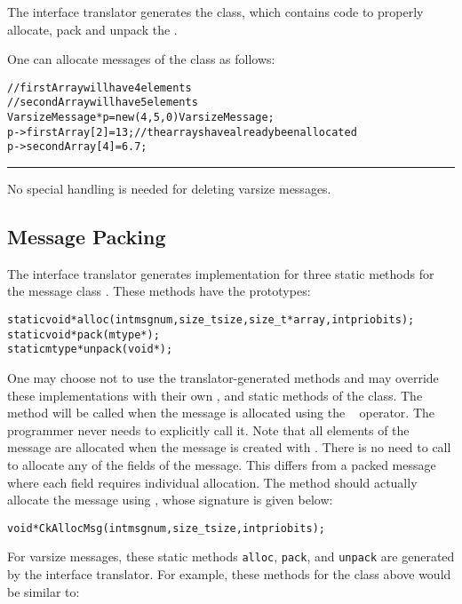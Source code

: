 {The interface translator generates the  class,
which contains code to properly allocate, pack and unpack the
.


One can allocate messages of the  class as follows:

\begin{alltt}
// firstArray will have 4 elements
// secondArray will have 5 elements 
VarsizeMessage* p = new(4, 5, 0) VarsizeMessage;
p->firstArray[2] = 13;     // the arrays have already been allocated 
p->secondArray[4] = 6.7; 
\end{alltt}

\hrule
\normalsize
No special handling is needed for deleting varsize messages.
} %

\subsection{Message Packing}

\label{message packing}

The \charmpp{} interface translator generates implementation for three static
methods for the message class . These methods have the
prototypes:

\begin{alltt}
    static void* alloc(int msgnum, size_t size, size_t* array, int priobits);
    static void* pack(mtype*);
    static mtype* unpack(void*);
\end{alltt}

One may choose not to use the translator-generated methods and may override
these implementations with their own ,  and 
static methods of the  class.  The  method will be called
when the message is allocated using the \CC\  operator. The programmer
never needs to explicitly call it.  Note that all elements of the message are
allocated when the message is created with . There is no need to call
 to allocate any of the fields of the message. This differs from a
packed message where each field requires individual allocation. The 
method should actually allocate the message using , whose
signature is given below:

\begin{alltt}
void *CkAllocMsg(int msgnum, size_t size, int priobits);
\end{alltt}  


For varsize messages, these static methods \texttt{alloc}, \texttt{pack}, and 
\texttt{unpack} are
generated by the interface translator.  For example, these
methods for the  class above would be similar to:


